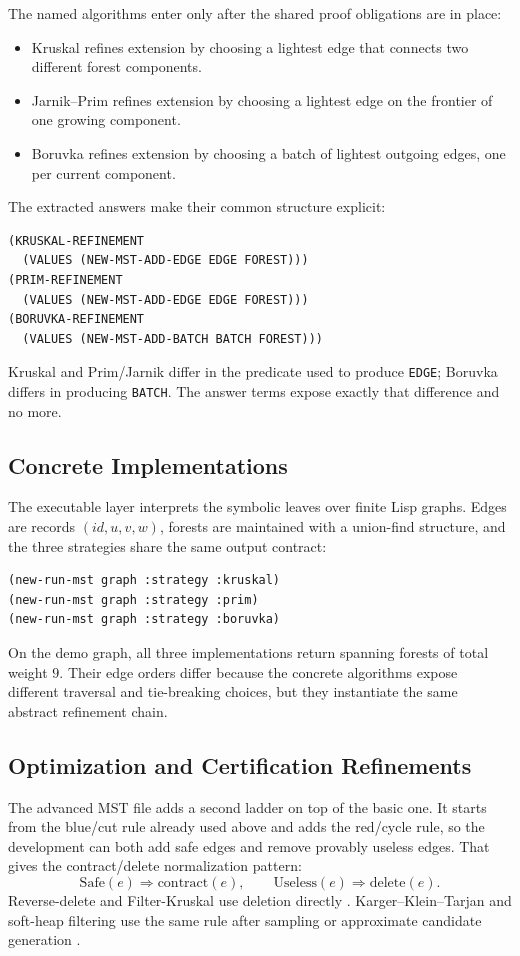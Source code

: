 \documentclass[runningheads]{llncs}
\begin{document}
The named algorithms enter only after the shared proof obligations are in
place:
\begin{itemize}
\item Kruskal refines extension by choosing a lightest edge that connects two
different forest components.
\item Jarnik--Prim refines extension by choosing a lightest edge on the
frontier of one growing component.
\item Boruvka refines extension by choosing a batch of lightest outgoing edges,
one per current component.
\end{itemize}
The extracted answers make their common structure explicit:
\begin{lstlisting}
(KRUSKAL-REFINEMENT
  (VALUES (NEW-MST-ADD-EDGE EDGE FOREST)))
(PRIM-REFINEMENT
  (VALUES (NEW-MST-ADD-EDGE EDGE FOREST)))
(BORUVKA-REFINEMENT
  (VALUES (NEW-MST-ADD-BATCH BATCH FOREST)))
\end{lstlisting}
Kruskal and Prim/Jarnik differ in the predicate used to produce \texttt{EDGE};
Boruvka differs in producing \texttt{BATCH}.  The answer terms expose exactly
that difference and no more.

\subsection{Concrete Implementations}

The executable layer interprets the symbolic leaves over finite Lisp graphs.
Edges are records \((id,u,v,w)\), forests are maintained with a union-find
structure, and the three strategies share the same output contract:
\begin{lstlisting}
(new-run-mst graph :strategy :kruskal)
(new-run-mst graph :strategy :prim)
(new-run-mst graph :strategy :boruvka)
\end{lstlisting}
On the demo graph, all three implementations return spanning forests of total
weight \(9\).  Their edge orders differ because the concrete algorithms expose
different traversal and tie-breaking choices, but they instantiate the same
abstract refinement chain.

\subsection{Optimization and Certification Refinements}

The advanced MST file adds a second ladder on top of the basic one.  It starts
from the blue/cut rule already used above and adds the red/cycle rule, so the
development can both add safe edges and remove provably useless edges.  That
gives the contract/delete normalization pattern:
\[
  \mathrm{Safe}(e)\Rightarrow \mathrm{contract}(e),\qquad
  \mathrm{Useless}(e)\Rightarrow \mathrm{delete}(e).
\]
Reverse-delete and Filter-Kruskal use deletion directly
\cite{CheritonTarjan1976,OsipovSandersSingler2009}.  Karger--Klein--Tarjan
and soft-heap filtering use the same rule after sampling or approximate
candidate generation \cite{KargerKleinTarjan1995,Chazelle2000}.
\end{document}
